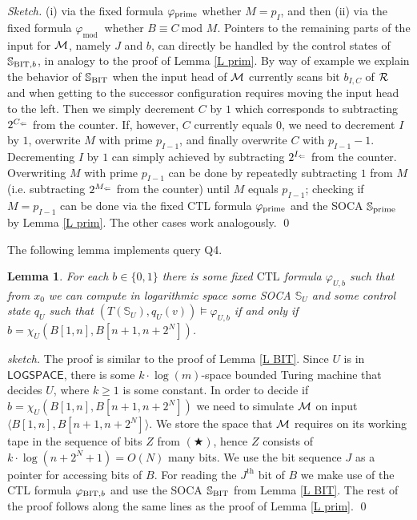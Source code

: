 \documentclass[times,envcountsame]{llncs}
\newtheorem{lemma}[theorem]{{\bf Lemma}}
\renewcommand{\mod}{\text{mod }}
\renewcommand{\L}{\mathsf{LOGSPACE}}
\newcommand{\Soca}{\mathbb{S}}
\newcommand{\ctl}{\text{CTL}}
\begin{document}
\begin{proof}[Sketch]
(i) via the fixed formula $\varphi_{\text{prime}}$ whether $M=p_I$, and
then (ii) via the fixed formula $\varphi_{\mod}$
whether $B\equiv C\ \mod M$.
Pointers to the remaining parts of the input for $\mathcal{M}$, namely $J$ and $b$,
can directly be handled by the control states of $\Soca_{\BIT,b}$,
in analogy to the proof of Lemma \ref{L prim}.
By way of example we explain the behavior of $\Soca_{\BIT}$ when the input head
of $\mathcal{M}$ currently scans bit $b_{I,C}$ of $\mathcal{R}$ and when getting
to the successor configuration requires moving the input head to the left.
Then we simply decrement $C$ by $1$ which corresponds to subtracting $2^{C_\Leftarrow}$
from the counter. If, however, $C$ currently equals $0$, we need to
decrement $I$ by $1$, overwrite $M$ with prime $p_{I-1}$, and finally
overwrite $C$ with $p_{I-1}-1$. Decrementing $I$ by $1$ can simply achieved by
subtracting $2^{I_\Leftarrow}$ from the counter. Overwriting $M$ with prime $p_{I-1}$
can be done by repeatedly subtracting $1$ from $M$ (i.e. subtracting $2^{M_\Leftarrow}$
from the counter) until $M$ equals $p_{I-1}$;
checking if $M=p_{I-1}$ can be done via the fixed $\ctl$ formula $\varphi_{\text{prime}}$
and the SOCA $\Soca_{\prim}$ by Lemma \ref{L prim}.
The other cases work analogously.
\qed
\end{proof}

\noindent
The following lemma implements query Q4.

\begin{lemma}{\label{L U}}
For each $b\in\{0,1\}$ there is some fixed $\ctl$ formula $\varphi_{U,b}$ such that
from $x_0$
we can compute in logarithmic space some SOCA $\Soca_U$ and some
control state $q_U$ such that $(T(\Soca_U),q_U(v))\models\varphi_{U,b}$
if and only if $b=\chi_U(B[1,n],B[n+1,n+2^N])$.
\end{lemma}
\begin{proof}[sketch]
The proof is similar to the proof of Lemma \ref{L BIT}.
Since $U$ is in $\L$, there is some $k\cdot\log(m)$-space bounded
Turing machine that decides $U$, where $k\geq 1$ is some constant.
In order to decide if $b=\chi_U(B[1,n],B[n+1,n+2^N])$ we
need to simulate $\mathcal{M}$ on input $\langle B[1,n],B[n+1,n+2^N]\rangle$.
We store the space that $\mathcal{M}$ requires on its working tape
in the sequence of bits $Z$ from $(\bigstar)$, hence $Z$ consists of
$k\cdot\log(n+2^N+1)=O(N)$ many bits.
We use the bit sequence $J$ as a pointer for accessing bits of $B$.
For reading the $J^{\text{th}}$ bit of $B$ we make use of the $\ctl$ formula
$\varphi_{\text{BIT},b}$ and use the SOCA $\Soca_\BIT$ from Lemma \ref{L BIT}.
The rest of the proof follows along the same lines as the proof of
Lemma \ref{L prim}.
\qed
\end{proof}
\end{document}
